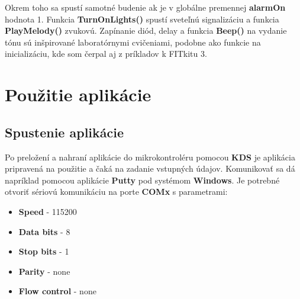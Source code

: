 \documentclass{article}
\begin{document}
        Okrem toho sa spustí samotné budenie ak je v globálne premennej \textbf{alarmOn} hodnota 1. Funkcia \textbf{TurnOnLights()} spustí sveteľnú signalizáciu a funkcia \textbf{PlayMelody()} zvukovú.
        Zapínanie diód, delay a funkcia \textbf{Beep()} na vydanie tónu sú inšpirované laboratórnymi cvičeniami, podobne ako funkcie na inicializáciu, kde som čerpal aj z príkladov k FITkitu 3.

        \newpage

    \section{Použitie aplikácie}
        \subsection{Spustenie aplikácie}
            Po preložení a nahraní aplikácie do mikrokontroléru pomocou \textbf{KDS} je aplikácia pripravená na použitie a čaká na zadanie vstupných údajov.
            Komunikovať sa dá napríklad pomocou aplikácie \textbf{Putty} pod systémom \textbf{Windows}.
            Je potrebné otvoriť sériovú komunikáciu na porte \textbf{COMx} s parametrami:
            \begin{itemize}
                \item \textbf{Speed} - 115200
                \item \textbf{Data bits} - 8
                \item \textbf{Stop bits} - 1
                \item \textbf{Parity} - none
                \item \textbf{Flow control} - none
            \end{itemize}
\end{document}
